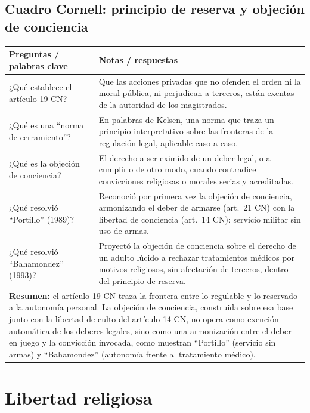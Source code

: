 \documentclass[12pt,oneside]{book}
\begin{document}
\section{Cuadro Cornell: principio de reserva y objeción de conciencia}

\begin{longtable}{@{}p{}p{}@{}}
\toprule
\textbf{Preguntas / palabras clave} & \textbf{Notas / respuestas} \\
\midrule
\endhead
¿Qué establece el artículo 19 CN? & Que las acciones privadas que no ofenden el
orden ni la moral pública, ni perjudican a terceros, están exentas de la autoridad
de los magistrados. \\
¿Qué es una ``norma de cerramiento''? & En palabras de Kelsen, una norma que
traza un principio interpretativo sobre las fronteras de la regulación legal,
aplicable caso a caso. \\
¿Qué es la objeción de conciencia? & El derecho a ser eximido de un deber legal, o
a cumplirlo de otro modo, cuando contradice convicciones religiosas o morales
serias y acreditadas. \\
¿Qué resolvió ``Portillo'' (1989)? & Reconoció por primera vez la objeción de
conciencia, armonizando el deber de armarse (art.\ 21 CN) con la libertad de
conciencia (art.\ 14 CN): servicio militar sin uso de armas. \\
¿Qué resolvió ``Bahamondez'' (1993)? & Proyectó la objeción de conciencia sobre
el derecho de un adulto lúcido a rechazar tratamientos médicos por motivos
religiosos, sin afectación de terceros, dentro del principio de reserva. \\
\midrule
\multicolumn{2}{p{0.95\textwidth}}{\textbf{Resumen:} el artículo 19 CN traza la
frontera entre lo regulable y lo reservado a la autonomía personal. La objeción de
conciencia, construida sobre esa base junto con la libertad de culto del artículo
14 CN, no opera como exención automática de los deberes legales, sino como una
armonización entre el deber en juego y la convicción invocada, como muestran
``Portillo'' (servicio sin armas) y ``Bahamondez'' (autonomía frente al
tratamiento médico).} \\
\bottomrule
\end{longtable}


\chapter{Libertad religiosa}
\label{cap:p13}
\end{document}
